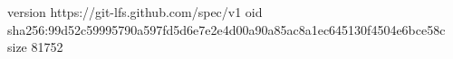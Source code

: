version https://git-lfs.github.com/spec/v1
oid sha256:99d52c59995790a597fd5d6e7e2e4d00a90a85ac8a1ec645130f4504e6bce58c
size 81752
